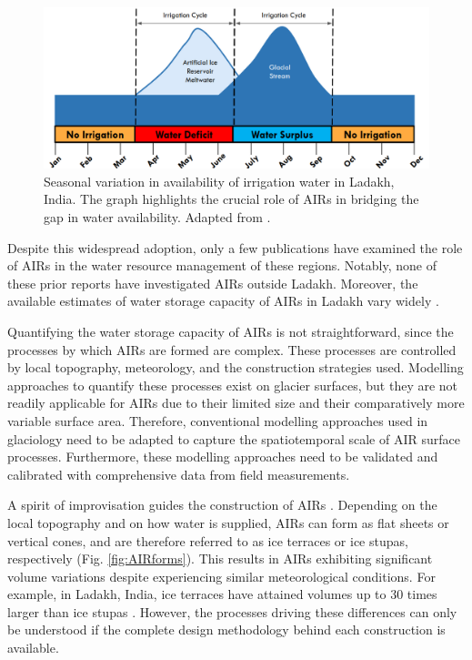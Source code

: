 \begin{figure}[htb] \centering \includegraphics[width=\textwidth]{figs/irrigation_cycles.png}
	\caption{Seasonal variation in availability of irrigation water in Ladakh, India. The graph highlights the
		crucial role of \ac{AIRs} in bridging the gap in water availability. Adapted from
		\citet{nusserLocalKnowledgeGlobal2016}.} \label{fig:irrigation_cycles} \end{figure}


Despite this widespread adoption, only a few publications have examined the role of \ac{AIRs} in the water
resource management of these regions. Notably, none of these prior reports have investigated \ac{AIRs} outside
Ladakh. Moreover, the available estimates of water storage capacity of \ac{AIRs} in Ladakh vary widely
\citep{norphelSnowWaterHarvesting2015, baglaArtificialGlaciersHelp1998}.

Quantifying the water storage capacity of \ac{AIRs} is not straightforward, since the processes by which
\ac{AIRs} are formed are complex. These processes are controlled by local topography, meteorology, and the
construction strategies used. Modelling approaches to quantify these processes exist on glacier surfaces, but
they are not readily applicable for \ac{AIRs} due to their limited size and their comparatively more variable
surface area. Therefore, conventional modelling approaches used in glaciology need to be adapted to capture the
spatiotemporal scale of \ac{AIR} surface processes. Furthermore, these modelling approaches need to be validated
and calibrated with comprehensive data from field measurements.

A spirit of improvisation guides the construction of \ac{AIRs} \citep{clouseLadakhArtificialGlaciers2017}.
Depending on the local topography and on how water is supplied, \ac{AIRs} can form as flat sheets or vertical
cones, and are therefore referred to as ice terraces or ice stupas, respectively (Fig. \ref{fig:AIRforms}). This
results in \ac{AIRs} exhibiting significant volume variations despite experiencing similar meteorological
conditions. For example, in Ladakh, India, ice terraces have attained volumes up to 30 times larger than ice
stupas \citep{nusserSociohydrologyArtificialGlaciers2019}. However, the processes driving these differences can
only be understood if the complete design methodology behind each construction is available.

